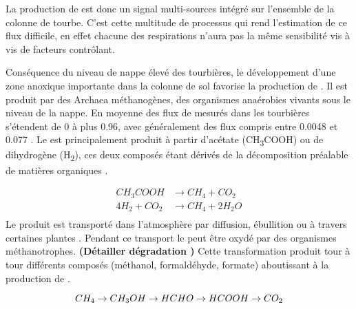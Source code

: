 La production de \coo est donc un signal multi-sources intégré sur l'ensemble de la colonne de tourbe. 
C'est cette multitude de processus qui rend l'estimation de ce flux difficile, en effet chacune des respirations n'aura pas la même sensibilité vis à vis de facteurs contrôlant.




Conséquence du niveau de nappe élevé des tourbières, le développement d'une zone anoxique importante dans la colonne de sol favorise la production de \chh.
Il est produit par des Archaea méthanogènes, des organismes anaérobies vivants sous le niveau de la nappe.
En moyenne des flux de \chh mesurés dans les tourbières s'étendent de 0 à plus \SI{0.96}{\uml}, avec généralement des flux compris entre \num{0.0048} et \SI{0.077}{\uml} \citep{blodau2002}.
Le \chh est principalement produit à partir d'acétate (CH\textsubscript{3}COOH) ou de dihydrogène (H\textsubscript{2}), ces deux composés étant dérivés de la décomposition préalable de matières organiques \citep{lai2009}.

$$\begin{aligned}
CH_{3}COOH  &\rightarrow CH_{4} + CO_{2}\\
4H_{2} + CO_{2} &\rightarrow CH_{4} + 2H_{2}O\\
\end{aligned} $$
Le \chh produit est transporté dans l'atmosphère par diffusion, ébullition ou à travers certaines plantes \citep{joabsson1999,colmer2003}.
Pendant ce transport le \chh peut être oxydé par des organismes méthanotrophes. \textbf{(Détailler dégradation \chh)}
Cette transformation produit tour à tour différents composés (méthanol, formaldéhyde, formate) aboutissant à la production de \coo \citep{whalen2005}.

$$
CH_{4} \rightarrow CH_{3}OH \rightarrow HCHO \rightarrow HCOOH \rightarrow CO_{2} \\
$$

